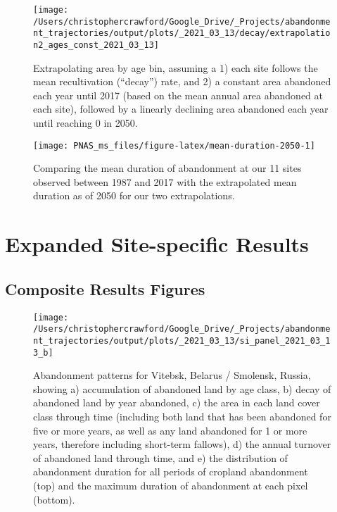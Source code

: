 \documentclass[9pt,twocolumn,twoside,]{pnas-new}
\begin{document}
\begin{figure}
\texttt{[image: /Users/christophercrawford/Google\_Drive/\_Projects/abandonment\_trajectories/output/plots/\_2021\_03\_13/decay/extrapolation2\_ages\_const\_2021\_03\_13]} \caption{Extrapolating area by age bin, assuming a 1) each site follows the mean recultivation (``decay'') rate, and 2) a constant area abandoned each year until 2017 (based on the mean annual area abandoned at each site), followed by a linearly declining area abandoned each year until reaching 0 in 2050.}\label{fig:extrapolation2-area-by-age}
\end{figure}



\begin{figure}
\texttt{[image: PNAS\_ms\_files/figure-latex/mean-duration-2050-1]} \caption{Comparing the mean duration of abandonment at our 11 sites observed between 1987 and 2017 with the extrapolated mean duration as of 2050 for our two extrapolations.}\label{fig:mean-duration-2050}
\end{figure}

\newpage

\hypertarget{expanded-site-specific-results}{%
\section{Expanded Site-specific Results}\label{expanded-site-specific-results}}

\hypertarget{composite-results-figures}{%
\subsection{Composite Results Figures}\label{composite-results-figures}}













\begin{figure}
\texttt{[image: /Users/christophercrawford/Google\_Drive/\_Projects/abandonment\_trajectories/output/plots/\_2021\_03\_13/si\_panel\_2021\_03\_13\_b]} \caption{Abandonment patterns for Vitebsk, Belarus / Smolensk, Russia, showing a) accumulation of abandoned land by age class, b) decay of abandoned land by year abandoned, c) the area in each land cover class through time (including both land that has been abandoned for five or more years, as well as any land abandoned for 1 or more years, therefore including short-term fallows), d) the annual turnover of abandoned land through time, and e) the distribution of abandonment duration for all periods of cropland abandonment (top) and the maximum duration of abandonment at each pixel (bottom).}\label{fig:panel-b}
\end{figure}
\end{document}
